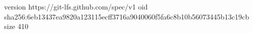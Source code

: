 version https://git-lfs.github.com/spec/v1
oid sha256:6eb13437ea9820a123115ecff3716a9040060f5fa6c8b10b56073445b13c19cb
size 410
